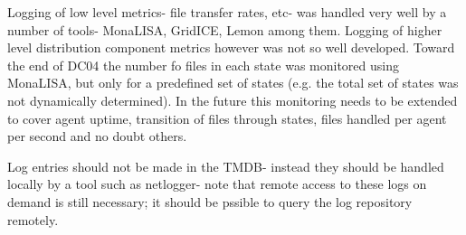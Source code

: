 \documentclass{cmspaper}
\begin{document}
Logging of low level metrics- file transfer rates, etc- was handled very well by a number of tools- MonaLISA, GridICE, Lemon among them. Logging of higher level distribution component metrics however was not so well developed. Toward the end of DC04 the number fo files in each state was monitored using MonaLISA, but only for a predefined set of states (e.g. the total set of states was not dynamically determined). In the future this monitoring needs to be extended to cover agent uptime, transition of files through states, files handled per agent per second and no doubt others.

Log entries should not be made in the TMDB- instead they should be handled locally by a tool such as netlogger- note that remote access to these logs on demand is still necessary; it should be pssible to query the log repository remotely.



\end{document}
